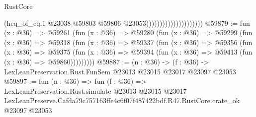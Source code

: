 \begin{lexlean}{RustCore}
\begin{coremodule}
                                            (heq_of_eq.{1}
                                              @23038
                                              @59803
                                              @59806
                                              @23053)))))))))))))))))))))
@59879 := fun (x : @36) =>
  @59261
    (fun (x : @36) =>
    @59280
      (fun (x : @36) =>
      @59299
        (fun (x : @36) =>
        @59318
          (fun (x : @36) =>
          @59337
            (fun (x : @36) =>
            @59356
              (fun (x : @36) =>
              @59375
                (fun (x : @36) => @59394 (fun (x : @36) => @59413 (fun (x : @36) => @59860)))))))))
@59887 := (n : @36) ->
  (f : @36) -> LexLeanPreservation.Rust.FunSem @23013 @23015 @23017 @23097 @23053
@59897 := fun (n : @36) =>
  fun (f : @36) =>
  LexLeanPreservation.Rust.simulate
    @23013
    @23015
    @23017
    LexLeanPreserve.Cafda79c757163ffe4c6f07f487422bdf.R47.RustCore.crate_ok
    @23097
    @23053
\end{coremodule}
\end{lexlean}
